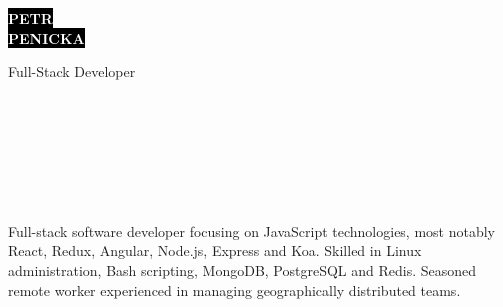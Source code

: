 \documentclass[9pt]{developercv}
\begin{document}
\begin{minipage}[t]{0.45\textwidth}
  \vspace{-\baselineskip}

  \colorbox{black}{{\HUGE\textcolor{white}{\textbf{\MakeUppercase{Petr}}}}}
  \\
  \colorbox{black}{{\HUGE\textcolor{white}{\textbf{\MakeUppercase{Penicka}}}}}

  \vspace{6pt}

  {\huge Full-Stack Developer}
\end{minipage}
\begin{minipage}[t]{0.275\textwidth}
  \vspace{-\baselineskip}

  \\
  \\
  \\
\end{minipage}
\begin{minipage}[t]{0.3\textwidth}
  \vspace{-\baselineskip}

  \\
  \\
\end{minipage}

\vspace{0.5cm}


\begin{minipage}[t]{1\textwidth}
  \vspace{-\baselineskip}

  {Full-stack software developer focusing on JavaScript technologies, most notably React, Redux, Angular, Node.js, Express and Koa.
    Skilled in Linux administration, Bash scripting, MongoDB, PostgreSQL and Redis.
    Seasoned remote worker experienced in managing geographically distributed teams.}\\
\end{minipage}

\end{document}
